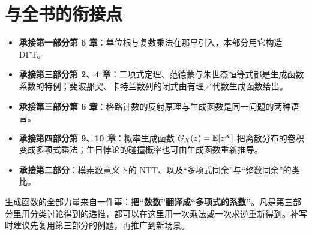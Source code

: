 \section{与全书的衔接点}
\begin{itemize}
\item \textbf{承接第一部分第 6 章}：单位根与复数乘法在那里引入，本部分用它构造 DFT。
\item \textbf{承接第三部分第 2、4 章}：二项式定理、范德蒙与朱世杰恒等式都是生成函数系数的特例；斐波那契、卡特兰数列的闭式由有理／代数生成函数给出。
\item \textbf{承接第三部分第 6 章}：格路计数的反射原理与生成函数是同一问题的两种语言。
\item \textbf{承接第四部分第 9、10 章}：概率生成函数 $G_X(z)=\mathbb E[z^X]$ 把离散分布的卷积变成多项式乘法；生日悖论的碰撞概率也可由生成函数重新推导。
\item \textbf{承接第二部分}：模素数意义下的 NTT、以及“多项式同余”与“整数同余”的类比。
\end{itemize}

\begin{tip}[给补写者的一句话]
生成函数的全部力量来自一件事：\textbf{把“数数”翻译成“多项式的系数”}。凡是第三部分里用分类讨论得到的递推，都可以在这里用一次乘法或一次求逆重新得到。补写时建议先复用第三部分的例题，再推广到新场景。
\end{tip}
